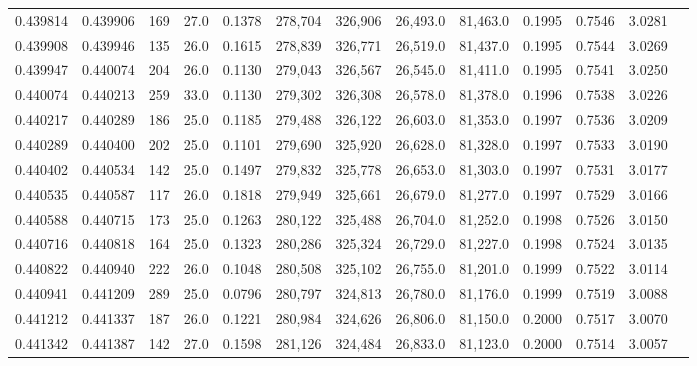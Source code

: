 \begin{tabular}{rrrrrrrrrrrrr}
0.439814 & 0.439906 &   169 & 27.0 &                                     0.1378 & 278,704 & 326,906 &  26,493.0 &  81,463.0 & 0.1995 & 0.7546 & 3.0281 \\
0.439908 & 0.439946 &   135 & 26.0 &                                     0.1615 & 278,839 & 326,771 &  26,519.0 &  81,437.0 & 0.1995 & 0.7544 & 3.0269 \\
0.439947 & 0.440074 &   204 & 26.0 &                                     0.1130 & 279,043 & 326,567 &  26,545.0 &  81,411.0 & 0.1995 & 0.7541 & 3.0250 \\
0.440074 & 0.440213 &   259 & 33.0 &                                     0.1130 & 279,302 & 326,308 &  26,578.0 &  81,378.0 & 0.1996 & 0.7538 & 3.0226 \\
0.440217 & 0.440289 &   186 & 25.0 &                                     0.1185 & 279,488 & 326,122 &  26,603.0 &  81,353.0 & 0.1997 & 0.7536 & 3.0209 \\
0.440289 & 0.440400 &   202 & 25.0 &                                     0.1101 & 279,690 & 325,920 &  26,628.0 &  81,328.0 & 0.1997 & 0.7533 & 3.0190 \\
0.440402 & 0.440534 &   142 & 25.0 &                                     0.1497 & 279,832 & 325,778 &  26,653.0 &  81,303.0 & 0.1997 & 0.7531 & 3.0177 \\
0.440535 & 0.440587 &   117 & 26.0 &                                     0.1818 & 279,949 & 325,661 &  26,679.0 &  81,277.0 & 0.1997 & 0.7529 & 3.0166 \\
0.440588 & 0.440715 &   173 & 25.0 &                                     0.1263 & 280,122 & 325,488 &  26,704.0 &  81,252.0 & 0.1998 & 0.7526 & 3.0150 \\
0.440716 & 0.440818 &   164 & 25.0 &                                     0.1323 & 280,286 & 325,324 &  26,729.0 &  81,227.0 & 0.1998 & 0.7524 & 3.0135 \\
0.440822 & 0.440940 &   222 & 26.0 &                                     0.1048 & 280,508 & 325,102 &  26,755.0 &  81,201.0 & 0.1999 & 0.7522 & 3.0114 \\
0.440941 & 0.441209 &   289 & 25.0 &                                     0.0796 & 280,797 & 324,813 &  26,780.0 &  81,176.0 & 0.1999 & 0.7519 & 3.0088 \\
0.441212 & 0.441337 &   187 & 26.0 &                                     0.1221 & 280,984 & 324,626 &  26,806.0 &  81,150.0 & 0.2000 & 0.7517 & 3.0070 \\
0.441342 & 0.441387 &   142 & 27.0 &                                     0.1598 & 281,126 & 324,484 &  26,833.0 &  81,123.0 & 0.2000 & 0.7514 & 3.0057 \\

\end{tabular}
